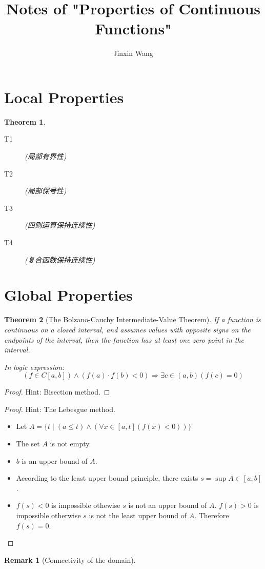 \documentclass[onecolumn]{ctexart}
\title{Notes of "Properties of Continuous Functions"}
\author{Jinxin Wang}
\date{}
\newtheorem{theorem}{Theorem}
\newtheorem{remark}{Remark}
\begin{document}
\maketitle

\section{Local Properties}

\begin{theorem}
  \begin{description}
    \item[T1] (局部有界性)
    \item[T2] (局部保号性)
    \item[T3] (四则运算保持连续性)
    \item[T4] (复合函数保持连续性)
  \end{description}
\end{theorem}

\section{Global Properties}

\begin{theorem}[The Bolzano-Cauchy Intermediate-Value Theorem]
  If a function is continuous on a closed interval, and assumes values with 
  opposite signs on the endpoints of the interval, then the function has at 
  least one zero point in the interval.

  In logic expression:
  \[
    (f \in C[a, b]) \wedge (f(a) \cdot f(b) < 0) \Rightarrow \exists c \in (a, b) (f(c) = 0)
  \]
\end{theorem}
\begin{proof}
  Hint: Bisection method.
\end{proof}
\begin{proof}
  Hint: The Lebesgue method.
  \begin{itemize}
    \item Let $A = \lbrace t \mid (a \leq t) \wedge (\forall x \in [a, t] 
    (f(x) < 0)) \rbrace$
    \item The set $A$ is not empty.
    \item $b$ is an upper bound of $A$.
    \item According to the least upper bound principle, there exists $s = \sup A \in [a, b]$.
    \item $f(s) < 0$ is impossible othewise $s$ is not an upper bound of $A$. 
    $f(s) > 0$ is impossible otherwise $s$ is not the least upper bound of $A$.
    Therefore $f(s) = 0$.
  \end{itemize}
\end{proof}
\begin{remark}[Connectivity of the domain]
  
\end{remark}
\end{document}
